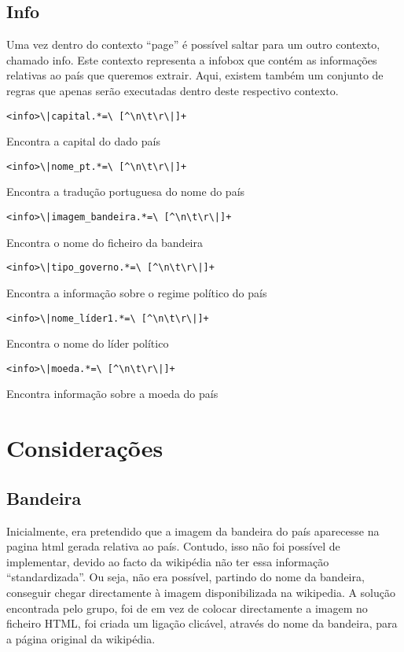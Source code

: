 \documentclass[12pt,a4paper]{report}
\begin{document}
\subsection{Info}
Uma vez dentro do contexto ``page'' é possível saltar para um outro contexto, chamado info. Este contexto representa a infobox que contém as informações relativas ao país que queremos extrair. Aqui, existem também um conjunto de regras que apenas serão executadas dentro deste respectivo contexto.
\begin{verbatim}
<info>\|capital.*=\ [^\n\t\r\|]+
\end{verbatim}
Encontra a capital do dado país
\begin{verbatim}
<info>\|nome_pt.*=\ [^\n\t\r\|]+
\end{verbatim}
Encontra a tradução portuguesa do nome do país
\begin{verbatim}
<info>\|imagem_bandeira.*=\ [^\n\t\r\|]+
\end{verbatim}
Encontra o nome do ficheiro da bandeira
\begin{verbatim}
<info>\|tipo_governo.*=\ [^\n\t\r\|]+ 
\end{verbatim}
Encontra a informação sobre o regime político do país 
\begin{verbatim}
<info>\|nome_líder1.*=\ [^\n\t\r\|]+
\end{verbatim}
Encontra o nome do líder político
\begin{verbatim}
<info>\|moeda.*=\ [^\n\t\r\|]+
\end{verbatim}
Encontra informação sobre a moeda do país

\section{Considerações} 

\subsection{Bandeira}
Inicialmente, era pretendido que a imagem da bandeira do país aparecesse na pagina html gerada relativa ao país. Contudo, isso não foi possível de implementar, devido ao facto da wikipédia não ter essa informação ``standardizada''. Ou seja, não era possível, partindo do nome da bandeira, conseguir chegar directamente à imagem disponibilizada na wikipedia. A solução encontrada pelo grupo, foi de em vez de colocar directamente a imagem no ficheiro HTML, foi criada um ligação clicável, através do nome da bandeira, para a página original da wikipédia.
\end{document}

